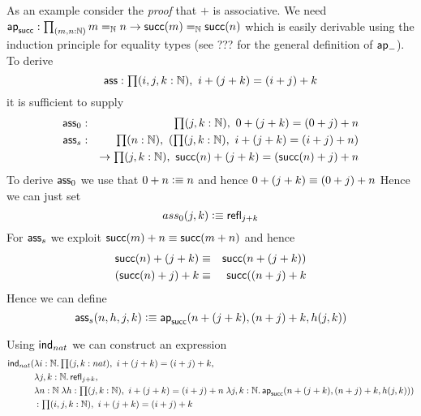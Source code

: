 As an example consider the \emph{proof} that $+$ is associative. We need $\apfunc{\suc} : \prd{m,n:\nat} m =_\nat n \to \suc(m) =_\nat \suc(n)$ which is easily derivable using the induction principle for equality types (see ??? for the general definition of $\mathsf{ap}_{-}$). To derive
\[\ass : \prd{i,j,k:\nat} i + (j + k) = (i + j) + k \]
it is sufficient to supply
\begin{align*}
  \ass_0 & : & \prd{j,k:\nat} 0 + (j + k) = (0+ j) + n \\
  \ass_s & : & \prd{n:\nat}(\prd{j,k:\nat} i + (j + k) = (i + j) + n) \\
  && \to \prd{j,k:\nat} \suc(n) + (j + k) = (\suc(n) + j) + n 
\end{align*}
To derive $\mathsf{ass}_0$ we use that $0+n \vcentcolon\equiv n$ and hence  $0 + (j + k) \equiv (0+ j) + n$ Hence we can just set
\[ ass_0(j,k) \vcentcolon\equiv \mathsf{refl}_{j+k} \]
For $\mathsf{ass}_s$ we exploit $\mathsf{succ}(m)+n \equiv \mathsf{succ}(m+n)$ and hence 
\begin{eqnarray*}
   \mathsf{succ}(n) + (j + k)  & \equiv & \mathsf{succ}(n+(j+k)) \\
   (\mathsf{succ}(n)+j)+k & \equiv & \mathsf{succ}((n+j)+k
\end{eqnarray*}
Hence we can define
\[\mathsf{ass}_s(n,h,j,k) \vcentcolon\equiv \mathsf{ap}_{\mathsf{succ}}(n+(j+k),(n+j)+k,h(j,k)) \]

Using $\mathsf{ind}_{nat}$ we can construct an expression 
\begin{align*}
  \ind{nat}(&\lam{i:\nat}\prd{j,k:nat} i + (j + k) = (i + j) + k ,\\
  & \lam{j,k:\nat}\refl{j+k}, \\
  & \lam{n:\nat}{h:\prd{j,k:\nat} i + (j + k) = (i + j) + n}{j,k:\nat}\apfunc{\suc}(n+(j+k),(n+j)+k,h(j,k)) )\\
& : \prd{i,j,k:\nat} i + (j + k) = (i + j) + k
\end{align*}




